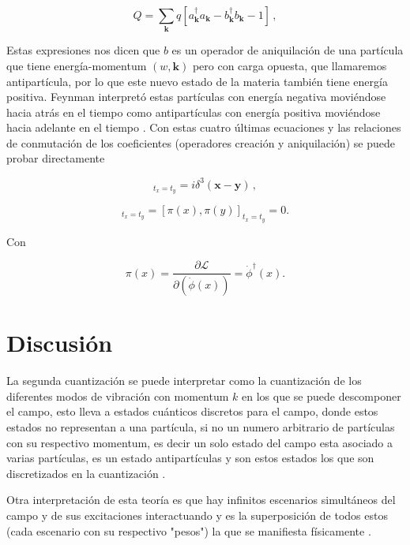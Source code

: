 \documentclass{article}
\begin{document}
\begin{equation}
  Q = \sum_{{\mathbf{k}}} q[a_{\mathbf{k}}^\dagger a_{\mathbf{k}} - b_{\mathbf{k}}^\dagger b_{\mathbf{k}} - 1]\,,
\end{equation}

Estas expresiones nos dicen que $b$ es un operador de aniquilación  de una partícula que tiene energía-momentum $(w,\mathbf{k})$ pero con carga opuesta, que llamaremos antipartícula, por lo que este nuevo estado de la materia también tiene energía positiva. Feynman interpretó estas partículas con energía negativa moviéndose hacia atrás en el tiempo como antipartículas con energía positiva moviéndose hacia adelante en el tiempo \cite{Kaku:1993}.
Con estas cuatro últimas ecuaciones y las relaciones de conmutación de los coeficientes (operadores creación y aniquilación) se puede probar directamente

\begin{equation}
  [\phi(x),\pi(y)]_{t_x=t_y} = i \delta^3(\mathbf{x}-\mathbf{y})\,,
\end{equation}

\begin{equation}
  [\phi(x),\phi(y)]_{t_x=t_y} =
  [\pi(x),\pi(y)]_{t_x=t_y} = 0.
\end{equation}

Con

\begin{equation}
  \pi(x)=\frac{\partial\mathscr{L}}{\partial( \dot{\phi}(x))}=\dot{\phi}^\dagger (x).
\end{equation}

\section{Discusión}
La segunda cuantización se puede interpretar como la cuantización de los diferentes modos de vibración con momentum $k$ en los que se puede descomponer el campo, esto lleva a estados cuánticos discretos para el campo, donde estos estados no representan a una partícula, si no un numero arbitrario de partículas con su respectivo momentum, es decir un solo estado del campo esta asociado a varias partículas, es un estado antipartículas y son estos estados los que son discretizados en la cuantización \cite{Kaku:1993}.

Otra interpretación de esta teoría es que hay infinitos escenarios simultáneos del campo y de sus excitaciones interactuando  y es la superposición de todos estos (cada escenario con su respectivo "pesos")  la que se manifiesta físicamente \cite{Roussel:2020}.
\end{document}
